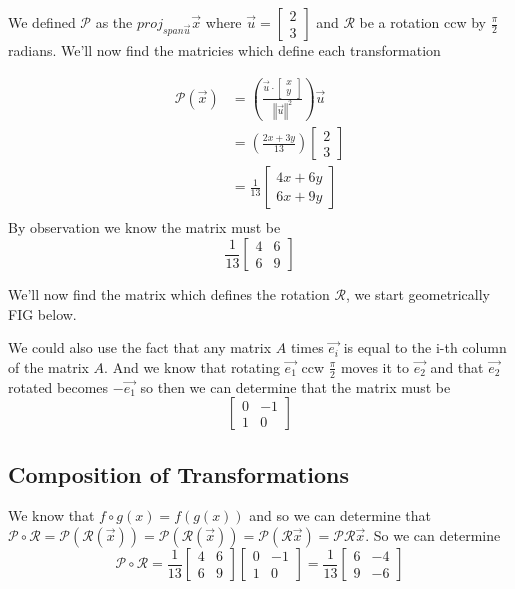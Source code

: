 \documentclass[notoc,notitlepage]{tufte-book}
\newcommand\mat[1]{\begin{bmatrix}#1\end{bmatrix}}
\begin{document}
We defined $\mathcal{P}$ as the $\mathit{proj}_{\mathit{span} {\vec{u}} }
{\vec{x}} $ where $\vec{u} = \mat{ 2 \\ 3 }$ and $\mathcal{R}$ be a rotation ccw
by $\frac{\pi }{2}$ radians. We'll now find the matricies which define each
transformation

\begin{eg}
    \begin{align*}
        \mathcal{P}\left(\vec{x}\right) &= \left( \frac{\vec{u} \cdot \mat{ x \\ y}}{\left\Vert \vec{u} \right\Vert^2} \right) \vec{u}\\
        &= \left( \frac{2x + 3y}{13} \right) \mat{ 2 \\ 3 }\\
        &=\frac{1}{13} \mat{ 4x + 6y \\ 6x + 9y }\\
    \end{align*}
    By observation we know the matrix must be
    \begin{equation*}
        \frac{1}{13} \mat{ 4 & 6 \\ 6 & 9 }
    \end{equation*}
\end{eg}

\begin{eg}
    We'll now find the matrix which defines the rotation $\mathcal{R}$, we start
    geometrically FIG below.

    We could also use the fact that any matrix $A$ times $\vec{e_i}$ is equal to
    the i-th column of the matrix $A$. And we know that rotating $\vec{e_1}$ ccw
    $\frac{\pi }{2}$ moves it to $\vec{e_2}$ and that $\vec{e_2}$ rotated
    becomes $-\vec{e_1}$ so then we can determine that the matrix must be 
    \begin{equation*}
        \mat{ 0 & -1 \\ 1 & 0 }
    \end{equation*}
\end{eg}


\subsection{Composition of Transformations}%
\label{sub:composition_of_transformations}

We know that $f \circ g\left(x\right) = f\left(g\left(x\right)\right)$ and so
we can determine that $\mathcal{P} \circ \mathcal{R} =
\mathcal{P}\left(\mathcal{R}\left(\vec{x}\right)\right) =
\mathcal{P}\left(\mathcal{R}\left(\vec{x}\right)\right) =
\mathcal{P}\left(\mathcal{R} \vec{x}\right) = \mathcal{P} \mathcal{R} \vec{x}$.
So we can determine 
\begin{equation*}
    \mathcal{P} \circ \mathcal{R} = \frac{1}{13}\mat{ 4 & 6 \\ 6 & 9 } \mat{ 0 & -1 \\ 1 & 0
    } = \frac{1}{13} \mat{ 6 & -4 \\ 9 & -6 }
\end{equation*}
\end{document}

